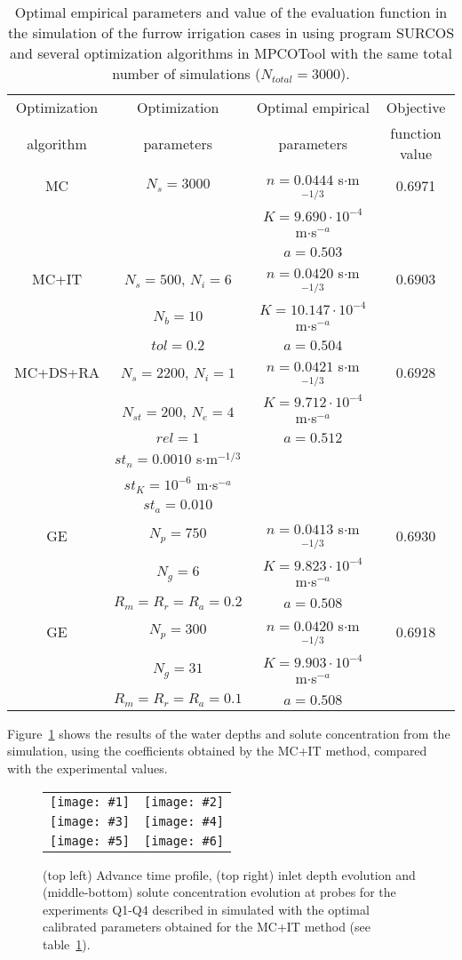 \documentclass[review,authoryear]{elsarticle}
\newcommand{\TABLE}[5]
{
	\begin{table}[ht!]
		\centering
		\caption{#4.\label{#5}}
		#1
		\begin{tabular}{#2}
			#3
		\end{tabular}
	\end{table}
}
\newcommand{\FIGVI}[8]
{
	\begin{figure}[ht!]
		\centering
		\begin{tabular}{cc}
			\texttt{[image: \#1]} & \texttt{[image: \#2]} \\
			\texttt{[image: \#3]} & \texttt{[image: \#4]} \\
			\texttt{[image: \#5]} & \texttt{[image: \#6]}
		\end{tabular}
		\caption{#7.\label{#8}}
	\end{figure}
}
\begin{document}
\TABLE{\scriptsize}{cccc}
{
	Optimization & Optimization & Optimal empirical & Objective
	\\ algorithm & parameters & parameters & function value
	\\ \hline
	MC & $N_s=3000$ & $n=0.0444$ s$\cdot$m$^{-1/3}$ & 0.6971
	\\ & & $K=9.690\cdot 10^{-4}$ m$\cdot$s$^{-a}$
	\\ & & $a=0.503$
	\\ \hline
	MC+IT & $N_s=500$, $N_i=6$ & $n=0.0420$ s$\cdot$m$^{-1/3}$ & 0.6903
	\\ & $N_b=10$ & $K=10.147\cdot 10^{-4}$ m$\cdot$s$^{-a}$
	\\ & $tol=0.2$ & $a=0.504$
	\\ \hline
	MC+DS+RA & $N_s=2200$, $N_i=1$ & $n=0.0421$ s$\cdot$m$^{-1/3}$ & 0.6928
	\\ & $N_{st}=200$, $N_e=4$ & $K=9.712\cdot 10^{-4}$ m$\cdot$s$^{-a}$
	\\ & $rel=1$ & $a=0.512$
	\\ & $st_n=0.0010$ s$\cdot$m$^{-1/3}$
	\\ & $st_K=10^{-6}$ m$\cdot$s$^{-a}$
	\\ & $st_a=0.010$
	\\ \hline
	GE & $N_p=750$ & $n=0.0413$ s$\cdot$m$^{-1/3}$  & 0.6930
	\\ & $N_g=6$ & $K=9.823\cdot 10^{-4}$ m$\cdot$s$^{-a}$
	\\ & $R_m=R_r=R_a=0.2$ & $a=0.508$
	\\ \hline
	GE & $N_p=300$ & $n=0.0420$ s$\cdot$m$^{-1/3}$  & 0.6918
	\\ & $N_g=31$ & $K=9.903\cdot 10^{-4}$ m$\cdot$s$^{-a}$
	\\ & $R_m=R_r=R_a=0.1$ & $a=0.508$
	\\ \hline
}{Optimal empirical parameters and value of the evaluation function in the simulation of the furrow irrigation cases in \citet{JaviSurcos2} using program SURCOS and several optimization algorithms in MPCOTool with the same total number of simulations ($N_{total}=3000$)}{TabSurcos}

Figure~\ref{FigSurcos} shows the results of the water depths and solute concentration from the simulation, using the coefficients obtained by the MC+IT method, compared with the experimental values.

\FIGVI{surcos-advance.eps}{surcos-depth.eps}{surcos-solute-q1.eps}
{surcos-solute-q2.eps}{surcos-solute-q3.eps}{surcos-solute-q4.eps}
{(top left) Advance time profile, (top right) inlet depth evolution and
(middle-bottom) solute concentration evolution at probes for the experiments
Q1-Q4 described in \citet{JaviSurcos2} simulated with the optimal calibrated
parameters obtained for the MC+IT method (see table~\ref{TabSurcos})}{FigSurcos}
\end{document}
